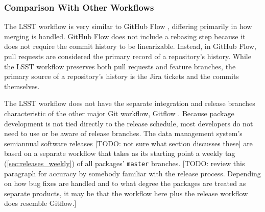 \subsubsection{Comparison With Other Workflows}\label{sec:other_git_workflows}

The LSST workflow is very similar to GitHub Flow \cite{GitHubFlow}, differing primarily in how merging is handled.
GitHub Flow does not include a rebasing step because it does not require the commit history to be linearizable.
Instead, in GitHub Flow, pull requests are considered the primary record of a repository's history.
While the LSST workflow preserves both pull requests and feature branches, the primary source of a repository's history is the Jira tickets and the commits themselves.

The LSST workflow does not have the separate integration and release branches characteristic of the other major Git workflow, Gitflow \cite{Gitflow}.
Because package development is not tied directly to the release schedule, most developers do not need to use or be aware of release branches.
The data management system's semiannual software releases [TODO: not sure what section discusses these] are based on a separate workflow that takes as its starting point a weekly tag (\autoref{sec:releases_weekly}) of all packages' \texttt{master} branches.
[TODO: review this paragraph for accuracy by somebody familiar with the release process. Depending on how bug fixes are handled and to what degree the packages are treated as separate products, it may be that the workflow here plus the release workflow does resemble Gitflow.]

